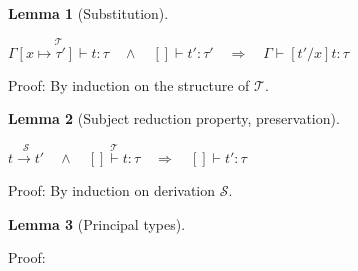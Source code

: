 \documentclass[a4paper]{article}
\newcommand{\im}{\Rightarrow}
\newcommand{\step}{\to}
\newcommand{\T}{\mathcal{T}}
\renewcommand{\S}{\mathcal{S}}
\newcommand{\stackover}[2]{\stackrel{{#2}}{#1}}
\newtheorem{lemma}{Lemma}[section]
\begin{document}
\begin{lemma}[Substitution] $ $
  \label{lemma:substitution}

$\stackover{\Gamma[x \mapsto \tau'] \vdash t: \tau}{\T} \quad \land \quad []\vdash t':\tau' \quad \im \quad
\Gamma \vdash [t'/x]t : \tau$
\end{lemma}

Proof: By induction on the structure of $\T$.


\begin{lemma}[Subject reduction property, preservation] $ $
  \label{lemma:preservation}

$\stackover{t \step t'}{\S} \quad \land \quad \stackover{[] \vdash t: \tau}{\T} \quad \im \quad [] \vdash t' : \tau$
\end{lemma}

Proof: By induction on derivation $\S$.


\begin{lemma}[Principal types] $ $
  \label{lemma:principalTypes}

\end{lemma}

Proof:


\newpage
\begin{appendices}



\end{appendices}

\newpage


\end{document}
